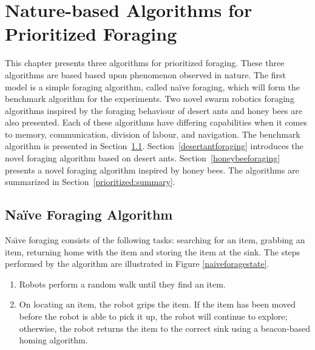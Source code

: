 
\chapter{Nature-based Algorithms for Prioritized Foraging}
\label{chap:third}


This chapter presents three algorithms for prioritized foraging. These three algorithms are based based upon phenomenon observed in nature. The first model is a simple foraging algorithm, called na\"ive foraging, which will form the benchmark algorithm for the experiments. Two novel swarm robotics foraging algorithms inspired by the foraging behaviour of desert ants and honey bees are also presented. Each of these algorithms have differing capabilities when it comes to memory, communication, division of labour, and navigation. The benchmark algorithm is presented in Section~\ref{naiveforaging}. Section~\ref{desertantforaging} introduces the novel foraging algorithm based on desert ants. Section~\ref{honeybeeforaging} presents a novel foraging algorithm inspired by honey bees. The algorithms are summarized in Section~\ref{prioritized:summary}.

\section{Na\"ive Foraging Algorithm}
\label{naiveforaging}

 Na\"\i ve foraging consists of the following tasks: searching for an item, grabbing an item, returning home with the item and storing the item at the sink. The steps performed by the algorithm are illustrated in Figure \ref{naiveforagestate}.  

\begin{enumerate}
	\item Robots perform a random walk until they find an item.
	\item On locating an item, the robot grips the item. If the item has been moved before the robot is able to pick it up, the robot will continue to explore; otherwise, the robot returns the item to the correct sink using a beacon-based homing algorithm.
\end{enumerate}



